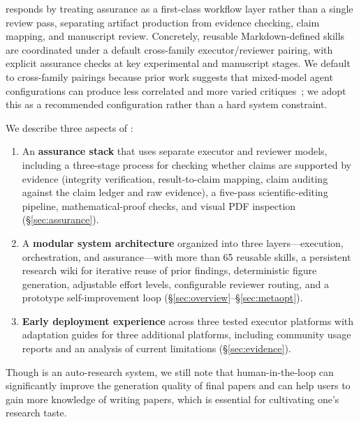 \aris{} responds by treating assurance as a first-class workflow layer rather than a single review pass, separating artifact production from evidence checking, claim mapping, and manuscript review. Concretely, reusable Markdown-defined skills are coordinated under a default cross-family executor/reviewer pairing, with explicit assurance checks at key experimental and manuscript stages. We default to cross-family pairings because prior work suggests that mixed-model agent configurations can produce less correlated and more varied critiques~\citep{du2024multiagentdebate,liang2024divergent}; we adopt this as a recommended configuration rather than a hard system constraint.

We describe three aspects of \aris{}:
\begin{enumerate}[nosep,leftmargin=*]
    \item An \textbf{assurance stack} that uses separate executor and reviewer models, including a three-stage process for checking whether claims are supported by evidence (integrity verification, result-to-claim mapping, claim auditing against the claim ledger and raw evidence), a five-pass scientific-editing pipeline, mathematical-proof checks, and visual PDF inspection (\S\ref{sec:assurance}).
    \item A \textbf{modular system architecture} organized into three layers---execution, orchestration, and assurance---with more than 65 reusable skills, a persistent research wiki for iterative reuse of prior findings, deterministic figure generation, adjustable effort levels, configurable reviewer routing, and a prototype self-improvement loop (\S\ref{sec:overview}--\S\ref{sec:metaopt}).
    \item \textbf{Early deployment experience} across three tested executor platforms with adaptation guides for three additional platforms, including community usage reports and an analysis of current limitations (\S\ref{sec:evidence}).
\end{enumerate}
\begin{remark}
    Though \aris{} is an auto-research system, we still note that human-in-the-loop can significantly improve the generation quality of final papers and can help users to gain more knowledge of writing papers, which is essential for cultivating one's research taste. 
\end{remark}

